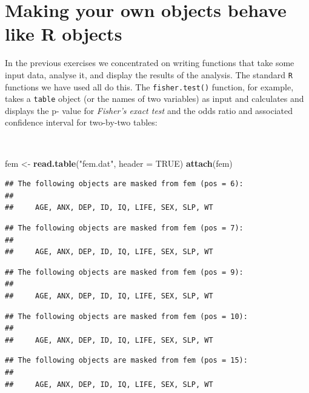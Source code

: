 \documentclass[12pt,a4paper]{book}
\newenvironment{Shaded}{\begin{snugshade}}{\end{snugshade}}
\newcommand{\DataTypeTok}[1]{\textcolor[rgb]{0.13,0.29,0.53}{#1}}
\newcommand{\KeywordTok}[1]{\textcolor[rgb]{0.13,0.29,0.53}{\textbf{#1}}}
\newcommand{\NormalTok}[1]{#1}
\newcommand{\OtherTok}[1]{\textcolor[rgb]{0.56,0.35,0.01}{#1}}
\newcommand{\StringTok}[1]{\textcolor[rgb]{0.31,0.60,0.02}{#1}}
\theoremstyle{definition}
\theoremstyle{definition}
\theoremstyle{definition}
\theoremstyle{remark}
\begin{document}
\hypertarget{exercise6}{%
\chapter{Making your own objects behave like R
objects}\label{exercise6}}

In the previous exercises we concentrated on writing functions that take
some input data, analyse it, and display the results of the analysis.
The standard \texttt{R} functions we have used all do this. The
\texttt{fisher.test()} function, for example, takes a \texttt{table}
object (or the names of two variables) as input and calculates and
displays the p- value for \emph{Fisher's exact test} and the odds ratio
and associated confidence interval for two-by-two tables:

~

\begin{Shaded}
\begin{Highlighting}[]
\NormalTok{fem <-}\StringTok{ }\KeywordTok{read.table}\NormalTok{(}\StringTok{"fem.dat"}\NormalTok{, }\DataTypeTok{header =} \OtherTok{TRUE}\NormalTok{)}
\KeywordTok{attach}\NormalTok{(fem)}
\end{Highlighting}
\end{Shaded}

\begin{verbatim}
## The following objects are masked from fem (pos = 6):
## 
##     AGE, ANX, DEP, ID, IQ, LIFE, SEX, SLP, WT
\end{verbatim}

\begin{verbatim}
## The following objects are masked from fem (pos = 7):
## 
##     AGE, ANX, DEP, ID, IQ, LIFE, SEX, SLP, WT
\end{verbatim}

\begin{verbatim}
## The following objects are masked from fem (pos = 9):
## 
##     AGE, ANX, DEP, ID, IQ, LIFE, SEX, SLP, WT
\end{verbatim}

\begin{verbatim}
## The following objects are masked from fem (pos = 10):
## 
##     AGE, ANX, DEP, ID, IQ, LIFE, SEX, SLP, WT
\end{verbatim}

\begin{verbatim}
## The following objects are masked from fem (pos = 15):
## 
##     AGE, ANX, DEP, ID, IQ, LIFE, SEX, SLP, WT
\end{verbatim}
\end{document}
